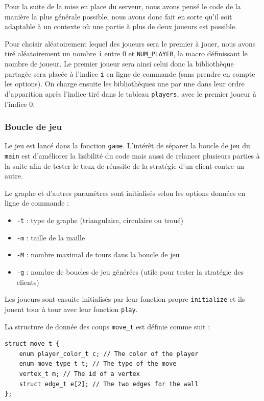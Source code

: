\bigskip

Pour la suite de la mise en place du serveur, nous avons pensé le code de la manière la plus générale possible, nous avons donc fait en sorte qu'il soit adaptable à un contexte où une partie à plus de deux joueurs est possible.

Pour choisir aléatoirement lequel des joueurs sera le premier à jouer, nous avons tiré aléatoirement un nombre \texttt{i} entre 0 et \texttt{NUM\_PLAYER}, la macro définissant le nombre de joueur. Le premier joueur sera ainsi celui donc la bibliothèque partagée sera placée à l'indice \texttt{i} en ligne de commande (sans prendre en compte les options).
On charge ensuite les bibliothèques une par une dans leur ordre d'apparition après l'indice tiré dans le tableau \texttt{players}, avec le premier joueur à l'indice 0.

\subsubsection*{Boucle de jeu}

Le jeu est lancé dans la fonction \texttt{game}. L'intérêt de séparer la boucle de jeu du \texttt{main} est d'améliorer la lisibilité du code mais aussi de relancer plusieurs parties à la suite afin de tester le taux de réussite de la stratégie d'un client contre un autre.

Le graphe et d'autres paramètres sont initialisés selon les options données en ligne de commande : 
\begin{itemize}
\item \texttt{-t} : type de graphe (triangulaire, circulaire ou troué)
\item \texttt{-m} : taille de la maille
\item \texttt{-M} : nombre maximal de tours dans la boucle de jeu
  \item \texttt{-g} : nombre de boucles de jeu générées (utile pour tester la stratégie des clients)
\end{itemize}

Les joueurs sont ensuite initialisés par leur fonction propre \texttt{initialize} et ils jouent tour à tour avec leur fonction \texttt{play}.

La structure de donnée des coups \texttt{move\_t} est définie comme suit :
\begin{lstlisting}[style=customc, label={lst:move}, caption={Définition du type move\_t}]
  struct move_t {
    enum player_color_t c; // The color of the player
    enum move_type_t t; // The type of the move
    vertex_t m; // The id of a vertex
    struct edge_t e[2]; // The two edges for the wall
};

\end{lstlisting}


